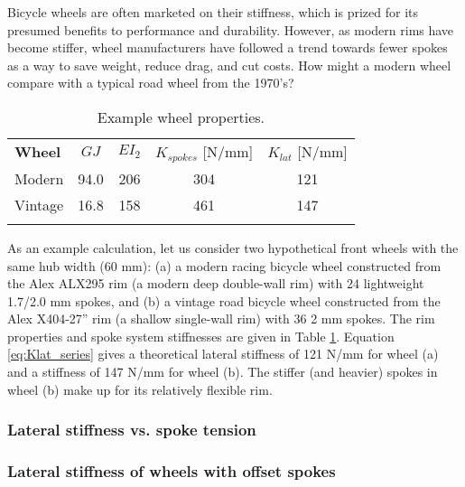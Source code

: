 \documentclass[\rootdir/thesis.tex]{subfiles}
\begin{document}
Bicycle wheels are often marketed on their stiffness, which is prized for its presumed benefits to performance and durability. However, as modern rims have become stiffer, wheel manufacturers have followed a trend towards fewer spokes as a way to save weight, reduce drag, and cut costs. How might a modern wheel compare with a typical road wheel from the 1970's?

\begin{table}[h]
\caption{Example wheel properties.\label{tab:wheels}}
\begin{tabular}{@{}lcccc}
\hline\noalign{\smallskip}
\bf{Wheel} & $GJ$ & $EI_{2}$ & $K_{spokes}$ [N/mm] & $K_{lat}$ [N/mm]\\
\noalign{\smallskip}\hline\noalign{\smallskip}
Modern & 94.0 & 206 & 304 & 121\\
Vintage & 16.8 & 158 & 461 & 147\\
\noalign{\smallskip}\hline
\end{tabular}
\end{table}

As an example calculation, let us consider two hypothetical front wheels with the same hub width (60 mm): (a) a modern racing bicycle wheel constructed from the Alex ALX295 rim (a modern deep double-wall rim) with 24 lightweight 1.7/2.0 mm spokes, and (b) a vintage road bicycle wheel constructed from the Alex X404-27'' rim (a shallow single-wall rim) with 36 2 mm spokes. The rim properties and spoke system stiffnesses are given in Table \ref{tab:wheels}. Equation \eqref{eq:Klat_series} gives a theoretical lateral stiffness of 121 N/mm for wheel (a) and a stiffness of 147 N/mm for wheel (b). The stiffer (and heavier) spokes in wheel (b) make up for its relatively flexible rim.

\subsubsection{Lateral stiffness vs. spoke tension}

\subsubsection{Lateral stiffness of wheels with offset spokes}

\subsubsection{}
\end{document}
